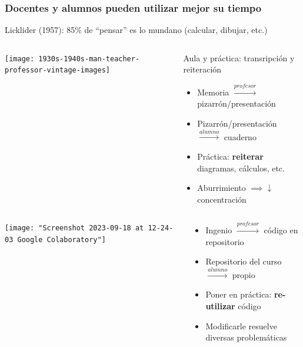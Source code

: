 \documentclass[aspectratio=43]{beamer}
\begin{document}
\begin{frame}
	\frametitle{Docentes y alumnos pueden utilizar mejor su tiempo}
	Licklider (1957): 85\% de ``pensar'' es lo mundano (calcular, dibujar, etc.)
	\pause
	\begin{block}{}
	  \begin{columns}[b]
			\begin{column}{0.3\textwidth}
				\texttt{[image: 1930s-1940s-man-teacher-professor-vintage-images]}
			\end{column}
			\begin{column}{0.65\textwidth}
				Aula y práctica: transripción y reiteración
				\begin{itemize}[<+->]
					\item Memoria \(\xrightarrow{profesor}\) pizarrón/presentación
					\item Pizarrón/presentación \(\xrightarrow{alumno}\) cuaderno
					\item Práctica: \textbf{reiterar} diagramas, cálculos, etc.
					\item Aburrimiento \(\implies \downarrow\) concentración
				\end{itemize}
			\end{column}
		\end{columns}
	\end{block}
	\pause
	\begin{block}{}
	  \begin{columns}[b]
			\begin{column}{0.3\textwidth}
				\texttt{[image: "Screenshot 2023-09-18 at 12-24-03 Google Colaboratory"]}
			\end{column}
			\begin{column}{0.65\textwidth}
				\begin{itemize}[<+->]
					\item Ingenio \(\xrightarrow{profesor}\) código en repositorio
					\item Repositorio del curso \(\xrightarrow{alumno}\) propio
					\item Poner en práctica: \textbf{re-utilizar} código
					\item Modificarle resuelve diversas problemáticas
				\end{itemize}
			\end{column}
		\end{columns}
	\end{block}
\end{frame}
\end{document}
